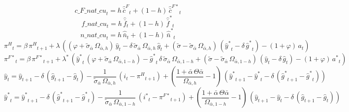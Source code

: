 \begin{dmath}
{c\_F\_nat\_cu}_{t}={{h}}\, {{\hat {\bar c}^F}}_{t}+\left(1-{{h}}\right)\, {{\hat {\bar c}^{F*}}}_{t}
\end{dmath}
\begin{dmath}
{f\_nat\_cu}_{t}={{h}}\, {{\hat {\bar f}}}_{t}+\left(1-{{h}}\right)\, {{\hat {\bar f}^*}}_{t}
\end{dmath}
\begin{dmath}
{n\_nat\_cu}_{t}={{h}}\, {{\hat {\bar n}}}_{t}+\left(1-{{h}}\right)\, {{\hat {\bar n}^*}}_{t}
\end{dmath}
\begin{dmath}
{{\pi^H}}_{t}={{\beta}}\, {{\pi^H}}_{t+1}+{{\lambda}}\, \left(\left({{\varphi}}+{{\tilde\sigma_{\bar{\alpha}}}}\, {{\Omega_{\bar \alpha,h}}}\right)\, {{\hat y}}_{t}-{{\delta}}\, {{\tilde\sigma_{\bar{\alpha}}}}\, {{\Omega_{\bar \alpha,h}}}\, {{\hat g}}_{t}+\left({{\tilde{\sigma}}}-{{\tilde\sigma_{\bar{\alpha}}}}\, {{\Omega_{\bar \alpha,h}}}\right)\, \left({{\hat y^*}}_{t}-{{\delta}}\, {{\hat g^*}}_{t}\right)-\left(1+{{\varphi}}\right)\, {{a}}_{t}\right)
\end{dmath}
\begin{dmath}
{{\pi^{F*}}}_{t}={{\beta}}\, {{\pi^{F*}}}_{t+1}+{{\lambda^*}}\, \left({{\hat y^*}}_{t}\, \left({{\varphi}}+{{\tilde\sigma_{\bar{\alpha}}}}\, {{\Omega_{\bar \alpha,1-h}}}\right)-{{\hat g^*}}_{t}\, {{\delta}}\, {{\tilde\sigma_{\bar{\alpha}}}}\, {{\Omega_{\bar \alpha,1-h}}}+\left({{\tilde{\sigma}}}-{{\tilde\sigma_{\bar{\alpha}}}}\, {{\Omega_{\bar \alpha,1-h}}}\right)\, \left({{\hat y}}_{t}-{{\delta}}\, {{\hat g}}_{t}\right)-\left(1+{{\varphi}}\right)\, {{a^*}}_{t}\right)
\end{dmath}
\begin{dmath}
{{\hat y}}_{t}={{\hat y}}_{t+1}-{{\delta}}\, \left({{\hat g}}_{t+1}-{{\hat g}}_{t}\right)-\frac{1}{{{\tilde\sigma_{\bar{\alpha}}}}\, {{\Omega_{\bar \alpha,h}}}}\, \left({{i}}_{t}-{{\pi^H}}_{t+1}\right)+\left(\frac{1+{{\bar{\alpha}}}\, {{\Theta{\bar{\alpha}}}}}{{{\Omega_{\bar \alpha,h}}}}-1\right)\, \left({{\hat y^*}}_{t+1}-{{\hat y^*}}_{t}-{{\delta}}\, \left({{\hat g^*}}_{t+1}-{{\hat g^*}}_{t}\right)\right)
\end{dmath}
\begin{dmath}
{{\hat y^*}}_{t}={{\hat y^*}}_{t+1}-{{\delta}}\, \left({{\hat g^*}}_{t+1}-{{\hat g^*}}_{t}\right)-\frac{1}{{{\tilde\sigma_{\bar{\alpha}}}}\, {{\Omega_{\bar \alpha,1-h}}}}\, \left({{i^*}}_{t}-{{\pi^{F*}}}_{t+1}\right)+\left(\frac{1+{{\bar{\alpha}}}\, {{\Theta{\bar{\alpha}}}}}{{{\Omega_{\bar \alpha,1-h}}}}-1\right)\, \left({{\hat y}}_{t+1}-{{\hat y}}_{t}-{{\delta}}\, \left({{\hat g}}_{t+1}-{{\hat g}}_{t}\right)\right)
\end{dmath}
